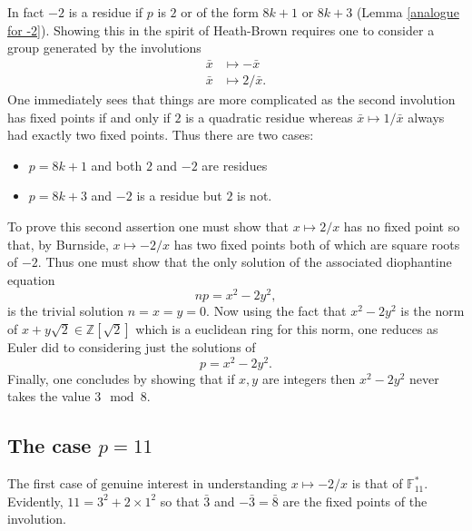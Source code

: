 \documentclass[12pt,a4paper]{amsart}
\begin{document}
In fact  $-2$  is a residue if $p$ is $2$ or of the form $8k+1$ or
$8k+3$ (Lemma \ref{analogue for -2}).
Showing this in the spirit of Heath-Brown requires one to consider a group generated by the involutions 
\begin{eqnarray*}
	\bar{x} & \mapsto -\bar{x} \\
	\bar{x} & \mapsto 2/\bar{x}.
\end{eqnarray*}
One immediately sees that things are more complicated as the
second involution has fixed points if and only if $2$ is a quadratic residue
whereas $\bar{x}\mapsto 1/\bar{x}$ always had exactly two fixed points.
Thus there are two cases:
\begin{itemize}
	\item $p=8k+1$ and both $2$ and $-2$ are residues
	\item $p=8k+3$ and $-2$ is a residue but $2$ is not.
\end{itemize}
To prove this second assertion 
one must show that 
$x  \mapsto 2/x$ has no fixed point
so that, by Burnside,
$x  \mapsto -2/x$ has two fixed points 
both of which are square roots of $-2$.
Thus one must show that the only solution of the associated diophantine equation 
$$np = x^2 - 2y^2,$$
is the trivial solution $n=x=y=0$.
Now using the fact that 
$x^2 - 2y^2$ 
is the norm of $x+y \sqrt{2}\in \mathbb{Z}[\sqrt{2}]$ which is a
euclidean ring for this norm,
one reduces as Euler did  to considering just the solutions of 
$$p = x^2 - 2y^2.$$
Finally, 
one concludes by showing that if $x,y$ are integers then
$x^2 - 2y^2$ never takes the value $3 \mod 8$.

\subsection{The case $p=11$}

The first case of genuine interest in understanding 
$x\mapsto -2/x$ is that of $\mathbb{F}_{11}^*$.
Evidently, $11 = 3^2 + 2\times 1^2$ so that 
$\bar{3}$ and $-\bar{3} = \bar{8}$ are the fixed points of the involution.
\end{document}
